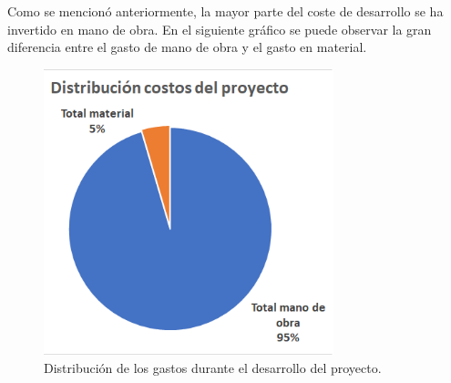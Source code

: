 Como se mencionó anteriormente, la mayor parte del coste de desarrollo se ha invertido en mano de obra. En el siguiente gráfico se puede observar la gran diferencia entre el gasto de mano de obra y el gasto en material.
\begin{figure}[H]
    \centering
    \includegraphics[width=0.75\textwidth]{Memoria_TFG_LaTeX/images/distribucionGastosDesarrollo.PNG}
    \caption{Distribución de los gastos durante el desarrollo del proyecto.}
    \label{fig:distribucionGastosDesarrollo}
\end{figure}
